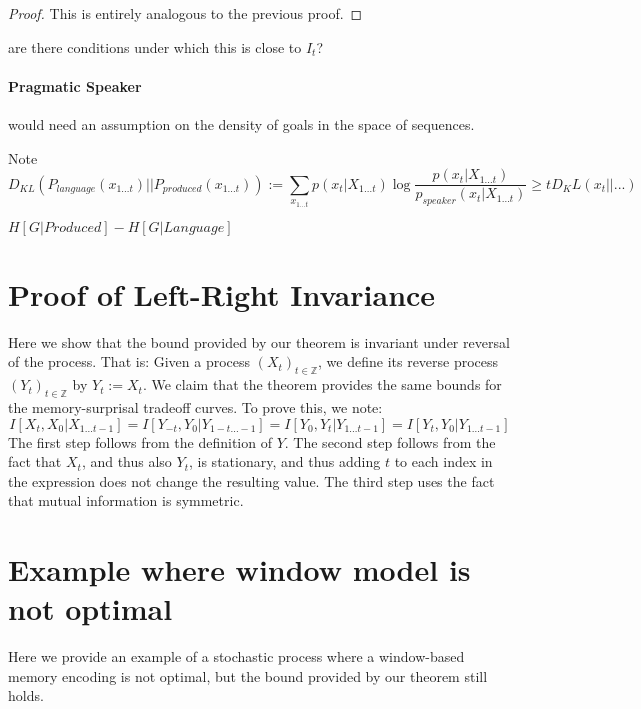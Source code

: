 \documentclass[11pt,letterpaper]{article}
\newcounter{theorem}
\begin{document}
\begin{proof}
This is entirely analogous to the previous proof.
\end{proof}


are there conditions under which this is close to $I_t$?

\paragraph{Pragmatic Speaker}

would need an assumption on the density of goals in the space of sequences.


Note 
\begin{equation}
	D_{KL}(P_{language}(x_{1\dots t})||P_{produced}(x_{1\dots t}))  := \sum_{x_{1\dots t}} p(x_t|X_{1\dots t}) \log \frac{p(x_t|X_{1\dots t})}{p_{speaker}(x_t|X_{1\dots t})} \geq t D_KL(x_t||...)
\end{equation}

$H[G|Produced] - H[G|Language]$



\section{Proof of Left-Right Invariance}

Here we show that the bound provided by our theorem is invariant under reversal of the process.
That is: Given a process $(X_t)_{t \in \mathbb{Z}}$, we define its reverse process $(Y_t)_{t \in \mathbb{Z}}$ by $Y_t := X_t$.
We claim that the theorem provides the same bounds for the memory-surprisal tradeoff curves.
To prove this, we note:
\begin{equation}
	I[X_t, X_0|X_{1\dots t-1}] = I[Y_{-t}, Y_0|Y_{1-t\dots -1}] = I[Y_0, Y_t|Y_{1\dots t-1}] = I[Y_t, Y_0|Y_{1\dots t-1}]
\end{equation}
The first step follows from the definition of $Y$. The second step follows from the fact that $X_t$, and thus also $Y_t$, is stationary, and thus adding $t$ to each index in the expression does not change the resulting value. The third step uses the fact that mutual information is symmetric.


\section{Example where window model is not optimal}

Here we provide an example of a stochastic process where a window-based memory encoding is not optimal, but the bound provided by our theorem still holds.
\end{document}
